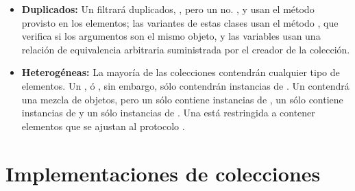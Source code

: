 \documentclass[a4paper,10pt,twoside]{book}
\begin{document}
\begin{itemize}
	La clase  es m\'as general que ; el tama\~{n}o en una  crece bajo demanda, y tiene m\'etodos para agregar al inicio () y al final () as\'i como tambi\'en  y .
  
  \item {\bf Duplicados:}
  	Un  filtrar\'a duplicados, , pero un  no.
	,  y  usan el m\'etodo \ct{=} provisto en los elementos; las variantes  de estas clases usan el m\'etodo \ct{==}, que verifica si los argumentos son el mismo objeto, y las variables  usan una relaci\'on de equivalencia arbitraria suministrada por el creador de la colecci\'on.

  \item {\bf Heterog\'eneas:}
  	La mayor\'ia de las colecciones contendr\'an cualquier tipo de elementos.
	Un ,  \'o , sin embargo, s\'olo contendr\'an instancias de .
	Un  contendr\'a una mezcla de objetos, pero un  s\'olo contiene instancias de , un  s\'olo contiene instancias de  y un  s\'olo instancias de .
	Una  est\'a restringida a contener elementos que se ajustan al protocolo .

\end{itemize}


\section{Implementaciones de colecciones}
\end{document}
